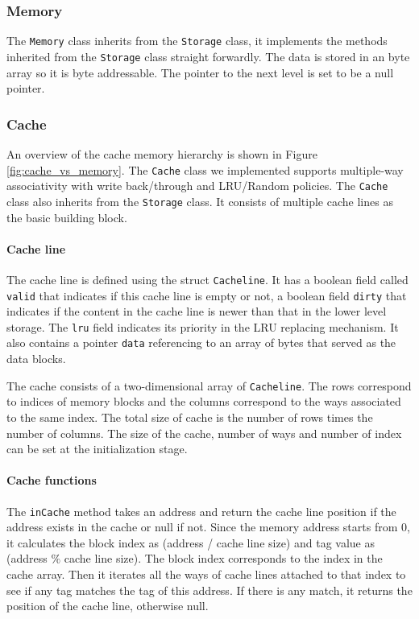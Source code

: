 \documentclass{sig-alternate}
\begin{document}
\subsubsection{Memory}
The \texttt{Memory} class inherits from the \texttt{Storage} class, it implements the methods inherited from the \texttt{Storage} class straight forwardly. The data is stored in an byte array so it is byte addressable. The pointer to the next level is set to be a null pointer. 

\subsubsection{Cache}
An overview of the cache memory hierarchy is shown in Figure \ref{fig:cache_vs_memory}. The \texttt{Cache} class we implemented supports multiple-way associativity with write back/through and LRU/Random policies. The \texttt{Cache} class also inherits from the \texttt{Storage} class. It consists of multiple cache lines as the basic building block.

\paragraph{Cache line}
 The cache line is defined using the struct \texttt{Cacheline}. It has a boolean field called \texttt{valid} that indicates if this cache line is empty or not, a boolean field \texttt{dirty} that indicates if the content in the cache line is newer than that in the lower level storage. The \texttt{lru} field indicates its priority in the LRU replacing mechanism. It also contains a pointer \texttt{data} referencing to an array of bytes that served as the data blocks.

The cache consists of a two-dimensional array of \texttt{Cacheline}. The rows correspond to indices of memory blocks and the columns correspond to the ways associated to the same index. The total size of cache is the number of rows times the number of columns. The size of the cache, number of ways and number of index can be set at the initialization stage.

\paragraph{Cache functions}
The \texttt{inCache} method takes an address and return the cache line position if the address exists in the cache or null if not. Since the memory address starts from 0, it calculates the block index as (address / cache line size) and tag value as (address $\%$ cache line size). The block index corresponds to the index in the cache array. Then it iterates all the ways of cache lines attached to that index to see if any tag matches the tag of this address. If there is any match, it returns the position of the cache line, otherwise null. 
\end{document}
